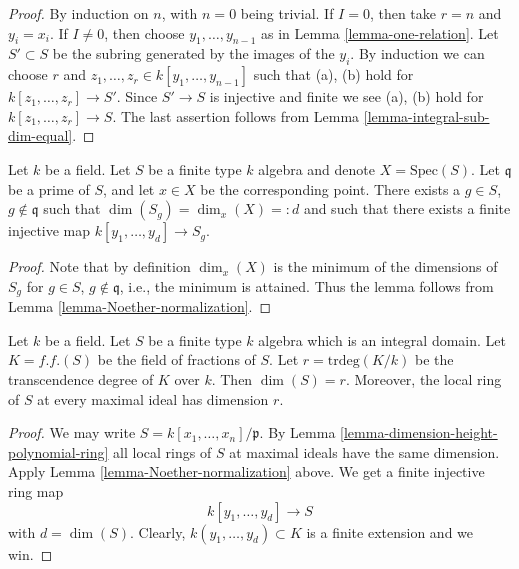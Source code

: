 \begin{proof}
By induction on $n$, with $n = 0$ being trivial.
If $I = 0$, then take $r = n$ and $y_i = x_i$.
If $I \not = 0$, then choose $y_1, \ldots, y_{n-1}$
as in Lemma \ref{lemma-one-relation}. Let
$S' \subset S$ be the subring generated by
the images of the $y_i$. By induction we can
choose $r$ and $z_1, \ldots, z_r \in k[y_1, \ldots, y_{n-1}]$
such that (a), (b) hold for $k[z_1, \ldots, z_r]
\to S'$. Since $S' \to S$ is injective and finite
we see (a), (b) hold for $k[z_1, \ldots, z_r]
\to S$. The last assertion follows from Lemma
\ref{lemma-integral-sub-dim-equal}.
\end{proof}

\begin{lemma}
\label{lemma-Noether-normalization-at-point}
Let $k$ be a field.
Let $S$ be a finite type $k$ algebra and denote $X = \text{Spec}(S)$.
Let $\mathfrak q$ be a prime of $S$, and let $x \in X$ be the
corresponding point. There exists a $g \in S$, $g \not \in \mathfrak q$
such that $\dim(S_g) = \dim_x(X) =: d$ and such that
there exists a finite injective map $k[y_1, \ldots, y_d] \to S_g$.
\end{lemma}

\begin{proof}
Note that by definition $\dim_x(X)$ is the minimum
of the dimensions of $S_g$ for $g \in S$, $g \not \in \mathfrak q$, i.e.,
the minimum is attained. Thus the lemma follows from
Lemma \ref{lemma-Noether-normalization}.
\end{proof}

\begin{lemma}
\label{lemma-dimension-prime-polynomial-ring}
Let $k$ be a field.
Let $S$ be a finite type $k$ algebra which is an integral domain.
Let $K = f.f.(S)$ be the field of fractions of $S$.
Let $r = \text{trdeg}(K/k)$ be the transcendence degree of $K$ over $k$.
Then $\dim(S) = r$. Moreover, the local ring of $S$ at every maximal
ideal has dimension $r$.
\end{lemma}

\begin{proof}
We may write $S = k[x_1, \ldots, x_n]/\mathfrak p$.
By Lemma \ref{lemma-dimension-height-polynomial-ring}
all local rings of $S$ at maximal ideals have the same dimension.
Apply Lemma \ref{lemma-Noether-normalization} above.
We get a finite injective ring map
$$
k[y_1, \ldots, y_d] \to S
$$
with $d = \dim(S)$. Clearly, $k(y_1, \ldots, y_d) \subset K$
is a finite extension and we win.
\end{proof}

